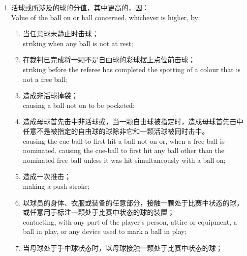 \begin{enumerate}[label=(\alph*),start=1]
\begin{enumerate}[label=(\roman*)]
        causing the cue-ball to be snookered by the nominated ball in Six Reds Snooker;
        \item 打一次跳球；\\
        playing a jump shot;
        \item 用不标准的球杆比赛；或\\
        playing with a non-standard cue; or
        \item 违反第\ref{223}节规则\ref{22318}\ref{22318e}同搭档商讨或交流。\\
        conferring or communicating with a partner contrary to Section \ref{223} Rule \ref{22318}\ref{22318e}.
    \end{enumerate}
    \item \label{22311b}活球或所涉及的球的分值，其中更高的，因：\\
    Value of the ball on or ball concerned, whichever is higher, by:
    \begin{enumerate}[label=(\roman*)]
        \item 当任意球未静止时击球；\\
        striking when any ball is not at rest;
        \item \label{22311bii}在裁判已完成将一颗不是自由球的彩球摆上点位前击球；\\
        striking before the referee has completed the spotting of a colour that is not a free ball;
        \item 造成非活球掉袋；\\
        causing a ball not on to be pocketed;
        \item 造成母球首先击中非活球或，当一颗自由球被指定时，造成母球首先击中任意不是被指定的自由球的球除非它和一颗活球被同时击中。\\
        causing the cue-ball to first hit a ball not on or, when a free ball is nominated, causing the cue-ball to first hit any ball other than the nominated free ball unless it was hit simultaneously with a ball on;
        \item 造成一次推击；\\
        making a push stroke;
        \item 以球员的身体、衣服或装备的任意部分，接触一颗处于比赛中状态的球，或任意用于标注一颗处于比赛中状态的球的装置；\\
        contacting, with any part of the player's person, attire or equipment, a ball in play, or any device used to mark a ball in play;
        \item 当母球处于手中球状态时，以母球接触一颗处于比赛中状态的球；\\

\end{enumerate}
\end{enumerate}
